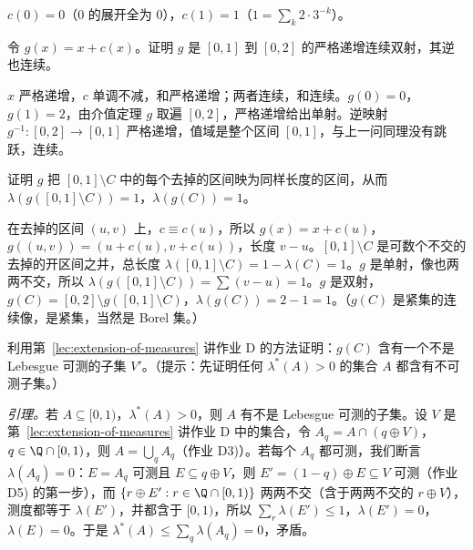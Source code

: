 \begin{probleme}
\begin{questions}
\begin{solution}
$c(0)=0$（$0$ 的展开全为 $0$），$c(1)=1$（$1=\sum_k2\cdot3^{-k}$）。
\end{solution}
\item 令 $g(x)=x+c(x)$。证明 $g$ 是 $[0,1]$ 到 $[0,2]$ 的严格递增连续双射，其逆也连续。
\begin{solution}
$x$ 严格递增，$c$ 单调不减，和严格递增；两者连续，和连续。$g(0)=0$，$g(1)=2$，由介值定理 $g$ 取遍 $[0,2]$，严格递增给出单射。逆映射 $g^{-1}:[0,2]\to[0,1]$ 严格递增，值域是整个区间 $[0,1]$，与上一问同理没有跳跃，连续。
\end{solution}
\item 证明 $g$ 把 $[0,1]\setminus C$ 中的每个去掉的区间映为同样长度的区间，从而 $\lambda(g([0,1]\setminus C))=1$，$\lambda(g(C))=1$。
\begin{solution}
在去掉的区间 $(u,v)$ 上，$c\equiv c(u)$，所以 $g(x)=x+c(u)$，$g((u,v))=(u+c(u),v+c(u))$，长度 $v-u$。$[0,1]\setminus C$ 是可数个不交的去掉的开区间之并，总长度 $\lambda([0,1]\setminus C)=1-\lambda(C)=1$。$g$ 是单射，像也两两不交，所以 $\lambda(g([0,1]\setminus C))=\sum(v-u)=1$。$g$ 是双射，$g(C)=[0,2]\setminus g([0,1]\setminus C)$，$\lambda(g(C))=2-1=1$。（$g(C)$ 是紧集的连续像，是紧集，当然是 Borel 集。）
\end{solution}
\item 利用第~\ref{lec:extension-of-measures} 讲作业 D 的方法证明：$g(C)$ 含有一个不是 Lebesgue 可测的子集 $V'$。（提示：先证明任何 $\lambda^*(A)>0$ 的集合 $A$ 都含有不可测子集。）
\begin{solution}
\emph{引理。}若 $A\subseteq[0,1)$，$\lambda^*(A)>0$，则 $A$ 有不是 Lebesgue 可测的子集。设 $V$ 是第~\ref{lec:extension-of-measures} 讲作业 D 中的集合，令 $A_q=A\cap(q\oplus V)$，$q\in\Q\cap[0,1)$，则 $A=\bigcup_qA_q$（作业 D3)）。若每个 $A_q$ 都可测，我们断言 $\lambda(A_q)=0$：$E=A_q$ 可测且 $E\subseteq q\oplus V$，则 $E'=(1-q)\oplus E\subseteq V$ 可测（作业 D5) 的第一步），而 $\{r\oplus E':r\in\Q\cap[0,1)\}$ 两两不交（含于两两不交的 $r\oplus V$），测度都等于 $\lambda(E')$，并都含于 $[0,1)$，所以 $\sum_r\lambda(E')\leqslant1$，$\lambda(E')=0$，$\lambda(E)=0$。于是 $\lambda^*(A)\leqslant\sum_q\lambda(A_q)=0$，矛盾。


\end{solution}
\end{questions}
\end{probleme}

